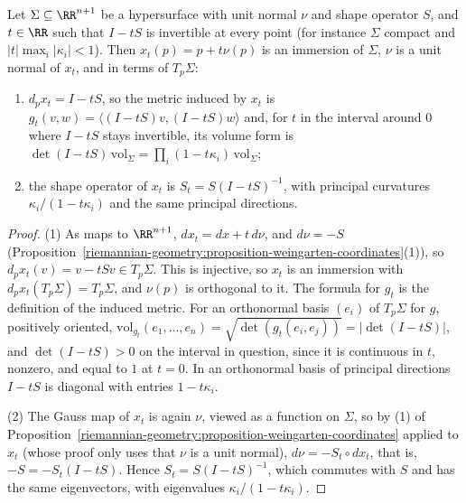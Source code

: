 \begin{proposition}\label{riemannian-geometry:proposition-parallel-hypersurfaces}
Let $\Sigma \subseteq \RR^{n+1}$ be a hypersurface with unit normal $\nu$ and shape operator $S$, and $t \in \RR$ such that $I - tS$ is invertible at every point (for instance $\Sigma$ compact and $|t|\max_i|\kappa_i| < 1$).
Then $x_t(p) = p + t\nu(p)$ is an immersion of $\Sigma$, $\nu$ is a unit normal of $x_t$, and in terms of $T_p\Sigma$:
\begin{enumerate}
\item $d_px_t = I - tS$, so the metric induced by $x_t$ is $g_t(v, w) = \langle(I - tS)v, (I - tS)w\rangle$ and, for $t$ in the interval around $0$ where $I - tS$ stays invertible, its volume form is
$\det(I - tS)\,\mathrm{vol}_\Sigma = \prod_i(1 - t\kappa_i)\,\mathrm{vol}_\Sigma$;
\item the shape operator of $x_t$ is $S_t = S(I - tS)^{-1}$, with principal curvatures $\kappa_i/(1 - t\kappa_i)$ and the same principal directions.
\end{enumerate}
\end{proposition}

\begin{proof}
(1) As maps to $\RR^{n+1}$, $dx_t = dx + t\,d\nu$, and $d\nu = -S$ (Proposition~\ref{riemannian-geometry:proposition-weingarten-coordinates}(1)), so $d_px_t(v) = v - tSv \in T_p\Sigma$. This is injective, so $x_t$ is an
immersion with $d_px_t(T_p\Sigma) = T_p\Sigma$, and $\nu(p)$ is orthogonal to it. The formula for $g_t$ is the definition of the induced metric. For an orthonormal basis $(e_i)$ of $T_p\Sigma$ for $g$, positively oriented,
$\mathrm{vol}_{g_t}(e_1, \ldots, e_n) = \sqrt{\det(g_t(e_i, e_j))} = |\det(I - tS)|$, and $\det(I - tS) > 0$ on the interval in question, since it is continuous in $t$, nonzero, and equal to $1$ at $t = 0$.
In an orthonormal basis of principal directions $I - tS$ is diagonal with entries $1 - t\kappa_i$.

(2) The Gauss map of $x_t$ is again $\nu$, viewed as a function on $\Sigma$, so by (1) of Proposition~\ref{riemannian-geometry:proposition-weingarten-coordinates} applied to $x_t$ (whose proof only uses that $\nu$ is a unit
normal), $d\nu = -S_t \circ dx_t$, that is, $-S = -S_t(I - tS)$. Hence $S_t = S(I - tS)^{-1}$, which commutes with $S$ and has the same eigenvectors, with eigenvalues $\kappa_i/(1 - t\kappa_i)$.
\end{proof}

